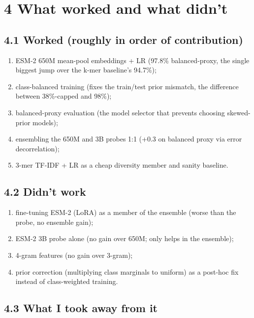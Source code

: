\documentclass[11pt,a4paper]{article}
\begin{document}
\section*{4 What worked and what didn't}

\subsection*{4.1 Worked (roughly in order of contribution)}

\begin{enumerate}
\item ESM-2 650M mean-pool embeddings + LR (97.8\% balanced-proxy, the
single biggest jump over the k-mer baseline's 94.7\%);
\item class-balanced training (fixes the train/test prior mismatch, the
difference between 38\%-capped and 98\%);
\item balanced-proxy evaluation (the model selector that prevents
choosing skewed-prior models);
\item ensembling the 650M and 3B probes 1:1 (+0.3 on balanced proxy via
error decorrelation);
\item 3-mer TF-IDF + LR as a cheap diversity member and sanity baseline.
\end{enumerate}

\subsection*{4.2 Didn't work}

\begin{enumerate}
\item fine-tuning ESM-2 (LoRA) as a member of the ensemble (worse than
the probe, no ensemble gain);
\item ESM-2 3B probe alone (no gain over 650M; only helps in the
ensemble);
\item 4-gram features (no gain over 3-gram);
\item prior correction (multiplying class marginals to uniform) as a
post-hoc fix instead of class-weighted training.
\end{enumerate}

\subsection*{4.3 What I took away from it}
\end{document}
